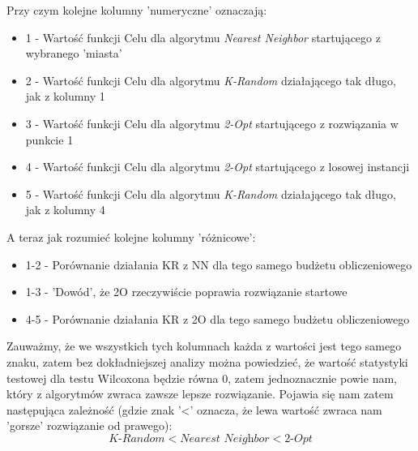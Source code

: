 \documentclass{article}
\begin{document}
Przy czym kolejne kolumny 'numeryczne' oznaczają:
\begin{itemize}
	\item 1 - Wartość funkcji Celu dla algorytmu \textit{Nearest Neighbor} startującego z wybranego 'miasta'
	\item 2 - Wartość funkcji Celu dla algorytmu \textit{K-Random} działającego tak długo, jak z kolumny 1
	\item 3 - Wartość funkcji Celu dla algorytmu \textit{2-Opt} startującego z rozwiązania w punkcie 1
	\item 4 - Wartość funkcji Celu dla algorytmu \textit{2-Opt} startującego z losowej instancji
	\item 5 - Wartość funkcji Celu dla algorytmu \textit{K-Random} działającego tak długo, jak z kolumny 4
\end{itemize}

A teraz jak rozumieć kolejne kolumny 'różnicowe':
\begin{itemize}
	\item 1-2 - Porównanie działania KR z NN dla tego samego budżetu obliczeniowego
	\item 1-3 - 'Dowód', że 2O rzeczywiście poprawia rozwiązanie startowe
	\item 4-5 - Porównanie działania KR z 2O dla tego samego budżetu obliczeniowego
\end{itemize}

Zauważmy, że we wszystkich tych kolumnach każda z wartości jest tego samego znaku, zatem bez dokładniejszej analizy można powiedzieć, że wartość statystyki testowej dla testu Wilcoxona będzie równa 0, zatem jednoznacznie powie nam, który z algorytmów zwraca zawsze lepsze rozwiązanie. Pojawia się nam zatem następująca zależność (gdzie znak '<' oznacza, że lewa wartość zwraca nam 'gorsze' rozwiązanie od prawego):
\[\textit{K-Random} < \textit{Nearest Neighbor} < \textit{2-Opt}\]

\newpage
\end{document}
